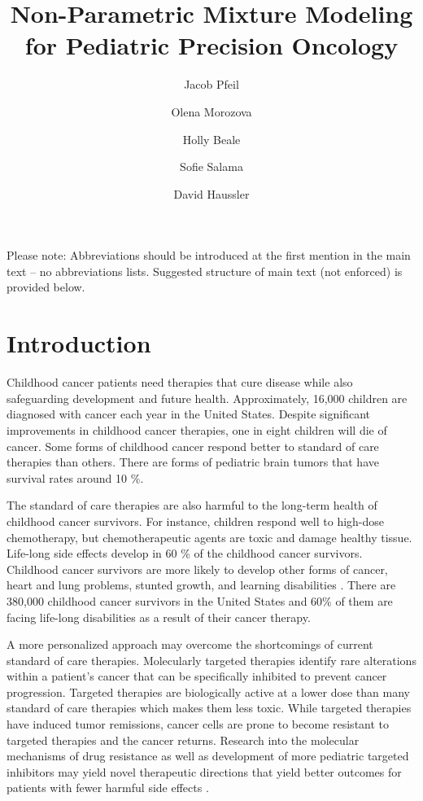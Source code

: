 \documentclass[fleqn,10pt]{wlscirep}
\title{Non-Parametric Mixture Modeling for Pediatric Precision Oncology}
\author[1,*]{Jacob Pfeil}
\author[1]{Olena Morozova}
\author[1]{Holly Beale}
\author[1]{Sofie Salama}
\author[1]{David Haussler}
\affil[1]{University of California, Santa Cruz, Biomolecular Engineering, Santa Cruz, 95064, United States}
\affil[*]{jpfeil@ucsc.edu}
\newcommand{\textapprox}{\raisebox{0.5ex}{\texttildelow}}
\begin{document}
\flushbottom
\maketitle
%
%
\thispagestyle{empty}

\noindent Please note: Abbreviations should be introduced at the first mention in the main text – no abbreviations lists. Suggested structure of main text (not enforced) is provided below.

\section*{Introduction}


Childhood cancer patients need therapies that cure disease while also safeguarding development and future health. Approximately, 16,000 children are diagnosed with cancer each year in the United States. Despite significant improvements in childhood cancer therapies, one in eight children will die of cancer. Some forms of childhood cancer respond better to standard of care therapies than others. There are forms of pediatric brain tumors that have survival rates around \textapprox 10 \%. 

The standard of care therapies are also harmful to the long-term health of childhood cancer survivors. For instance, children respond well to high-dose chemotherapy, but chemotherapeutic agents are toxic and damage healthy tissue. Life-long side effects develop in \textapprox 60 \% of the childhood cancer survivors. Childhood cancer survivors are more likely to develop other forms of cancer, heart and lung problems, stunted growth, and learning disabilities \cite{cancer.org:longTermEffects,kopp2012late,AmericanCancerSociety:ChildCancer}. There are \textapprox 380,000 childhood cancer survivors in the United States and 60\% of them are facing life-long disabilities as a result of their cancer therapy.

A more personalized approach may overcome the shortcomings of current standard of care therapies. Molecularly targeted therapies identify rare alterations within a patient's cancer that can be specifically inhibited to prevent cancer progression. Targeted therapies are biologically active at a lower dose than many standard of care therapies which makes them less toxic. While targeted therapies have induced tumor remissions, cancer cells are prone to become resistant to targeted therapies and the cancer returns. Research into the molecular mechanisms of drug resistance as well as development of more pediatric targeted inhibitors may yield novel therapeutic directions that yield better outcomes for patients with fewer harmful side effects \cite{norris2012challenges}. 
\end{document}
